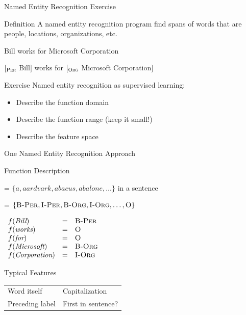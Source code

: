 \documentclass[14pt]{beamer}
\begin{document}
\begin{frame}{Named Entity Recognition Exercise}
\begin{block}{Definition}
A \alert{named entity recognition} program find spans of words that are people, locations, organizations, etc.\\
\medskip
\begin{description}[Output]
\item[Input] Bill works for Microsoft Corporation
\item[Output]
$[_{\textsc{\scriptsize Per}}$ Bill$]$ works for
$[_{\textsc{\scriptsize Org}}$ Microsoft Corporation$]$
\end{description}
\end{block}
\begin{block}{Exercise}
Named entity recognition as supervised learning:
\begin{itemize}
\item Describe the function domain
\item Describe the function range (\alert{keep it small!})
\item Describe the feature space
\end{itemize}
\end{block}
\end{frame}

\begin{frame}{One Named Entity Recognition Approach}
\begin{block}{Function Description}
\begin{description}[$D_f$]
\item[$D_f$] = $\{\textit{a},\textit{aardvark},\textit{abacus},\textit{abalone},\ldots\}$ in a sentence
\item[$R_f$] = $\{\textsc{B-Per},\textsc{I-Per},\textsc{B-Org},\textsc{I-Org},\ldots,\textsc{O}\}$
\end{description}
\end{block}
$\begin{array}{lll}
f(\textit{Bill})        & = & \textsc{B-Per} \\
f(\textit{works})       & = & \textsc{O} \\
f(\textit{for})         & = & \textsc{O} \\
f(\textit{Microsoft})   & = & \textsc{B-Org} \\
f(\textit{Corporation}) & = & \textsc{I-Org} \\
\end{array}$
\begin{block}{Typical Features}
\begin{tabular}{p{}p{}}
Word itself     & Capitalization \\
Preceding label & First in sentence? \\
\end{tabular}
\end{block}
\end{frame}
\end{document}
